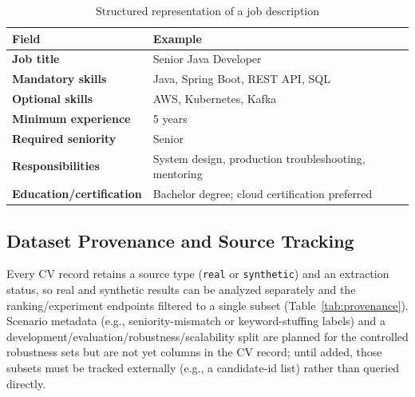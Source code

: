 \documentclass[12pt,a4paper,oneside]{report}
\begin{document}
\begin{table}[htbp]
\centering
\caption{Structured representation of a job description}
\label{tab:jdstructure}
\begin{tabularx}{\textwidth}{>{\bfseries}p{}X}
\toprule
Field & Example \\
\midrule
Job title & Senior Java Developer \\
Mandatory skills & Java, Spring Boot, REST API, SQL \\
Optional skills & AWS, Kubernetes, Kafka \\
Minimum experience & 5 years \\
Required seniority & Senior \\
Responsibilities & System design, production troubleshooting, mentoring \\
Education/certification & Bachelor degree; cloud certification preferred \\
\bottomrule
\end{tabularx}
\end{table}

\subsection{Dataset Provenance and Source Tracking}
Every CV record retains a source type (\texttt{real} or \texttt{synthetic}) and an extraction status, so real and synthetic results can be analyzed separately and the ranking/experiment endpoints filtered to a single subset (Table~\ref{tab:provenance}). Scenario metadata (e.g., seniority-mismatch or keyword-stuffing labels) and a development/evaluation/robustness/scalability split are planned for the controlled robustness sets but are not yet columns in the CV record; until added, those subsets must be tracked externally (e.g., a candidate-id list) rather than queried directly.
\end{document}
